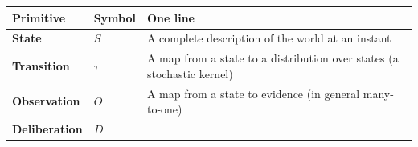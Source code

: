 \documentclass[11pt]{article}
\begin{document}
\begin{longtable}[]{@{}lll@{}}
\toprule
\begin{minipage}[b]{0.30\columnwidth}\raggedright
Primitive\strut
\end{minipage} & \begin{minipage}[b]{0.30\columnwidth}\raggedright
Symbol\strut
\end{minipage} & \begin{minipage}[b]{0.30\columnwidth}\raggedright
One line\strut
\end{minipage}\tabularnewline
\midrule
\endhead
\begin{minipage}[t]{0.30\columnwidth}\raggedright
\textbf{State}\strut
\end{minipage} & \begin{minipage}[t]{0.30\columnwidth}\raggedright
\(S\)\strut
\end{minipage} & \begin{minipage}[t]{0.30\columnwidth}\raggedright
A complete description of the world at an instant\strut
\end{minipage}\tabularnewline
\begin{minipage}[t]{0.30\columnwidth}\raggedright
\textbf{Transition}\strut
\end{minipage} & \begin{minipage}[t]{0.30\columnwidth}\raggedright
\(\tau\)\strut
\end{minipage} & \begin{minipage}[t]{0.30\columnwidth}\raggedright
A map from a state to a distribution over states (a stochastic kernel)\strut
\end{minipage}\tabularnewline
\begin{minipage}[t]{0.30\columnwidth}\raggedright
\textbf{Observation}\strut
\end{minipage} & \begin{minipage}[t]{0.30\columnwidth}\raggedright
\(O\)\strut
\end{minipage} & \begin{minipage}[t]{0.30\columnwidth}\raggedright
A map from a state to evidence (in general many-to-one)\strut
\end{minipage}\tabularnewline
\begin{minipage}[t]{0.30\columnwidth}\raggedright
\textbf{Deliberation}\strut
\end{minipage} & \begin{minipage}[t]{0.30\columnwidth}\raggedright
\(D\)\strut
\end{minipage} & \begin{minipage}[t]{0.30\columnwidth}\raggedright

\end{minipage}
\end{longtable}
\end{document}
